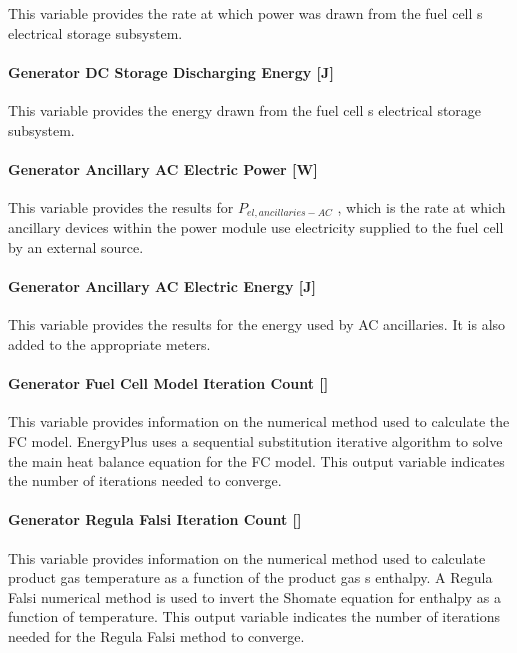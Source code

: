 This variable provides the rate at which power was drawn from the fuel cell s electrical storage subsystem.

\paragraph{Generator DC Storage Discharging Energy {[}J{]}}\label{generator-dc-storage-discharging-energy-j}

This variable provides the energy drawn from the fuel cell s electrical storage subsystem.

\paragraph{Generator Ancillary AC Electric Power {[}W{]}}\label{generator-ancillary-ac-electric-power-w}

This variable provides the results for \({P_{el,ancillaries - AC}}\) , which is the rate at which ancillary devices within the power module use electricity supplied to the fuel cell by an external source.

\paragraph{Generator Ancillary AC Electric Energy {[}J{]}}\label{generator-ancillary-ac-electric-energy-j}

This variable provides the results for the energy used by AC ancillaries. It is also added to the appropriate meters.

\paragraph{Generator Fuel Cell Model Iteration Count {[]}}\label{generator-fuel-cell-model-iteration-count}

This variable provides information on the numerical method used to calculate the FC model. EnergyPlus uses a sequential substitution iterative algorithm to solve the main heat balance equation for the FC model. This output variable indicates the number of iterations needed to converge.

\paragraph{Generator Regula Falsi Iteration Count {[]}}\label{generator-regula-falsi-iteration-count}

This variable provides information on the numerical method used to calculate product gas temperature as a function of the product gas s enthalpy. A Regula Falsi numerical method is used to invert the Shomate equation for enthalpy as a function of temperature. This output variable indicates the number of iterations needed for the Regula Falsi method to converge.

